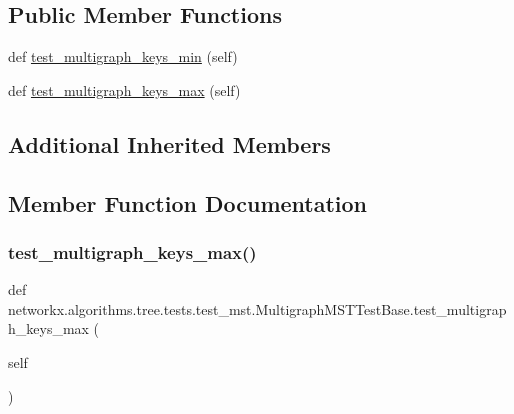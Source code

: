 \subsection*{Public Member Functions}
\begin{DoxyCompactItemize}
\item 
def \hyperlink{classnetworkx_1_1algorithms_1_1tree_1_1tests_1_1test__mst_1_1MultigraphMSTTestBase_a189c86fd34a325d17a58d54596292e2c}{test\+\_\+multigraph\+\_\+keys\+\_\+min} (self)
\item 
def \hyperlink{classnetworkx_1_1algorithms_1_1tree_1_1tests_1_1test__mst_1_1MultigraphMSTTestBase_a13bb2713f0b2b98f37ff9f5c3fb11141}{test\+\_\+multigraph\+\_\+keys\+\_\+max} (self)
\end{DoxyCompactItemize}
\subsection*{Additional Inherited Members}


\subsection{Member Function Documentation}
\mbox{\label{classnetworkx_1_1algorithms_1_1tree_1_1tests_1_1test__mst_1_1MultigraphMSTTestBase_a13bb2713f0b2b98f37ff9f5c3fb11141}} 
\subsubsection{\texorpdfstring{test\+\_\+multigraph\+\_\+keys\+\_\+max()}{test\_multigraph\_keys\_max()}}
{\footnotesize\ttfamily def networkx.\+algorithms.\+tree.\+tests.\+test\+\_\+mst.\+Multigraph\+M\+S\+T\+Test\+Base.\+test\+\_\+multigraph\+\_\+keys\+\_\+max (\begin{DoxyParamCaption}\item[{}]{self }\end{DoxyParamCaption})}

